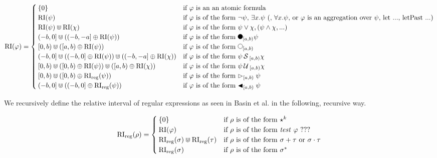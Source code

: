 \begin{equation*}
    \RI(\varphi) =
    \begin{cases}
        \{0\}     & \text{if $\varphi$ is an an atomic formula} \\ 
        \RI(\psi) & \text{if $\varphi$ is of the form $\neg \psi$, 
                            $\exists x.\psi$ (, $\forall x.\psi$, 
                            or $\varphi$ is an aggregation over $\psi$, let ..., letPast ...)} \\
        \RI(\psi) \Cup \RI(\chi) & \text{if $\varphi$ is of the form $\psi \lor \chi,
                                         (\psi \land \chi, ...)$} \\
        (-b,0] \Cup ((-b,-a] \oplus \RI(\psi)) & \text{if $\varphi$ is of the form $\Previous_{[a,b)}\psi$} \\
        [0,b) \Cup ([a,b) \oplus \RI(\psi)) & \text{if $\varphi$ is of the form $\Next_{[a,b)}$}\\
        (-b,0] \Cup ((-b,0] \oplus \RI(\psi)) \Cup ((-b,-a] \oplus \RI(\chi)) & \text{if $\varphi$ is of the form $\psi \Since_{[a,b)} \chi$} \\
        [0,b) \Cup ([0,b) \oplus \RI(\psi)) \Cup ([a,b) \oplus \RI(\chi)) & \text{if $\varphi$ is of the form $\psi \Until_{[a,b)} \chi$} \\
        [0,b) \Cup ([0,b) \oplus \RIr(\psi)) & \text{if $\varphi$ is of the form $\Fregex_{[a,b)} \psi$ }\\
        (-b,0] \Cup ((-b,0] \oplus \RIr(\psi)) & \text{if $\varphi$ is of the form $\Pregex_{[a,b)} \psi$ }\\
    \end{cases}
\end{equation*}

We recursively define the relative interval of regular expressions as seen in Basin et al. \cite{Basin2020} in the following, recursive way.

\begin{equation*}
    \operatorname{RI}_{\text{reg}}(\rho) =
    \begin{cases}
        \{0\} & \text{if $\rho$ is of the form $\star^k$} \\
        \operatorname{RI}(\varphi) & \text{if $\rho$ is of the form \textit{test} $\varphi$ ???} \\
        \operatorname{RI}_{\text{reg}}(\sigma) \Cup \operatorname{RI}_{\text{reg}}(\tau) & \text{if $\rho$ is of the form $\sigma + \tau$ or $\sigma \cdot \tau$} \\
        \operatorname{RI}_{\text{reg}}(\sigma) & \text{if $\rho$ is of the form $\sigma^*$}

    \end{cases}
\end{equation*}

